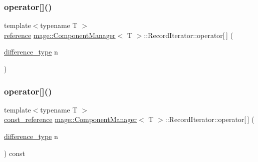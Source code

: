 \subsubsection{\texorpdfstring{operator[]()}{operator[]()}\hspace{0.1cm}{\footnotesize\ttfamily [1/2]}}
{\footnotesize\ttfamily template$<$typename T $>$ \\
\mbox{\hyperlink{classmage_1_1_component_manager_1_1_record_iterator_a79a091c8d61811bc67982e19500ab6eb}{reference}} \mbox{\hyperlink{classmage_1_1_component_manager}{mage\+::\+Component\+Manager}}$<$ T $>$\+::Record\+Iterator\+::operator\mbox{[}$\,$\mbox{]} (\begin{DoxyParamCaption}\item[{\mbox{\hyperlink{classmage_1_1_component_manager_1_1_record_iterator_a3ca7b08fca57e3f69c5de58be46edd70}{difference\+\_\+type}}}]{n }\end{DoxyParamCaption})\hspace{0.3cm}{\ttfamily [noexcept]}}

\mbox{\label{classmage_1_1_component_manager_1_1_record_iterator_a5804915826c1aed9cb80457aadf47025}} 
\subsubsection{\texorpdfstring{operator[]()}{operator[]()}\hspace{0.1cm}{\footnotesize\ttfamily [2/2]}}
{\footnotesize\ttfamily template$<$typename T $>$ \\
\mbox{\hyperlink{classmage_1_1_component_manager_1_1_record_iterator_a811f90589628f6726fdf264b0d3b89a0}{const\+\_\+reference}} \mbox{\hyperlink{classmage_1_1_component_manager}{mage\+::\+Component\+Manager}}$<$ T $>$\+::Record\+Iterator\+::operator\mbox{[}$\,$\mbox{]} (\begin{DoxyParamCaption}\item[{\mbox{\hyperlink{classmage_1_1_component_manager_1_1_record_iterator_a3ca7b08fca57e3f69c5de58be46edd70}{difference\+\_\+type}}}]{n }\end{DoxyParamCaption}) const\hspace{0.3cm}{\ttfamily [noexcept]}}


